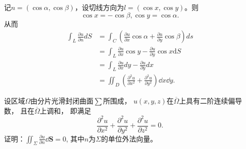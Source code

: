   \begin{solution}
记$n=(\cos\alpha,\cos\beta)$，设切线方向为$l=(\cos x,\cos y)$。则
$$\cos x=-\cos\beta,\cos y=\cos\alpha.$$
从而
\begin{align*}
\int_L\frac{\partial u}{\partial n}dS&=\int_C(\frac{\partial u}{\partial x}\cos\alpha+\frac{\partial u}{\partial y}\cos\beta)ds\\
&=\int_L\frac{\partial u}{\partial x}\cos y-\frac{\partial u}{\partial y}\cos x\mathrm{d}S\\
&=\int_L\frac{\partial u}{\partial x}dy-\frac{\partial u}{\partial y}dx\\
&=\iint_D(\frac{\partial^2u}{\partial x^2}+\frac{\partial^2u}{\partial y^2})\dd x\dd y.
\end{align*}  
  \end{solution}

  \begin{exercise}
设区域$\Omega$由分片光滑封闭曲面$\sum$所围成，
$u(x,y,z)$在$\overline{\Omega}$上具有二阶连续偏导数，
且在$\overline{\Omega}$上调和，
即满足
$$\frac{\partial^2u}{\partial x^2}+\frac{\partial^2u}{\partial y^2}+\frac{\partial^2u}{\partial z^2}=0.$$  
  证明：$\iint_{\Sigma}\frac{\partial u}{\partial n}\dd \mathbf{S} = 0$, 
  其中$n$为$\Sigma$的单位外法向量。
  \end{exercise}

